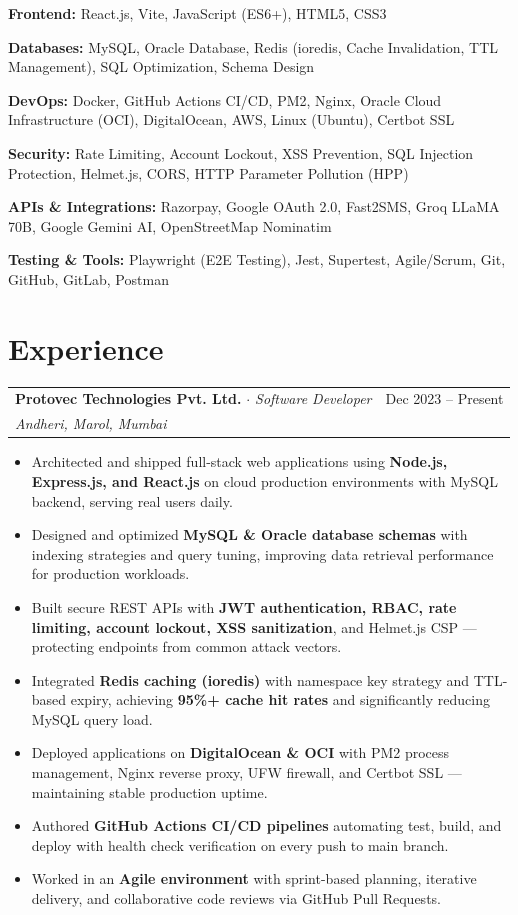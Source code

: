 \documentclass[a4paper,11pt]{article}
\makeatletter
\newcommand{\cvitem}[1]{
  \item\small{\color{darkgray}#1}\vspace{0pt}
}
\newcommand{\jobheading}[4]{
  \vspace{2pt}
  \begin{tabular*}{\textwidth}{l@{\extracolsep{\fill}}r}
    \textbf{\color{darkgray}#1} \small\textit{\color{medgray} $\cdot$ #3} & \small\color{medgray}#2 \\
    \small\color{medgray}\textit{#4} & \\
  \end{tabular*}\vspace{-4pt}
}
\newcommand{\cvlist}{\begin{itemize}[leftmargin=0.20in, rightmargin=0in, topsep=4pt, itemsep=3pt, parsep=0pt]}
\newcommand{\cvlistend}{\end{itemize}\vspace{3pt}}
\makeatother
\begin{document}
\noindent\textbf{\color{primary}Frontend:} React.js, Vite, JavaScript (ES6+), HTML5, CSS3

\noindent\textbf{\color{primary}Databases:} MySQL, Oracle Database, Redis (ioredis, Cache Invalidation, TTL Management), SQL Optimization, Schema Design

\noindent\textbf{\color{primary}DevOps:} Docker, GitHub Actions CI/CD, PM2, Nginx, Oracle Cloud Infrastructure (OCI), DigitalOcean, AWS, Linux (Ubuntu), Certbot SSL

\noindent\textbf{\color{primary}Security:} Rate Limiting, Account Lockout, XSS Prevention, SQL Injection Protection, Helmet.js, CORS, HTTP Parameter Pollution (HPP)

\noindent\textbf{\color{primary}APIs \& Integrations:} Razorpay, Google OAuth 2.0, Fast2SMS, Groq LLaMA 70B, Google Gemini AI, OpenStreetMap Nominatim

\noindent\textbf{\color{primary}Testing \& Tools:} Playwright (E2E Testing), Jest, Supertest, Agile/Scrum, Git, GitHub, GitLab, Postman

\setlength{\parskip}{0pt}
\vspace{-2pt}

\section{Experience}

\vspace{4pt}
\jobheading{Protovec Technologies Pvt. Ltd.}{Dec 2023 -- Present}{Software Developer}{Andheri, Marol, Mumbai}

\cvlist
  \cvitem{Architected and shipped full-stack web applications using \textbf{Node.js, Express.js, and React.js} on cloud production environments with MySQL backend, serving real users daily.}
  \cvitem{Designed and optimized \textbf{MySQL \& Oracle database schemas} with indexing strategies and query tuning, improving data retrieval performance for production workloads.}
  \cvitem{Built secure REST APIs with \textbf{JWT authentication, RBAC, rate limiting, account lockout, XSS sanitization}, and Helmet.js CSP --- protecting endpoints from common attack vectors.}
  \cvitem{Integrated \textbf{Redis caching (ioredis)} with namespace key strategy and TTL-based expiry, achieving \textbf{95\%+ cache hit rates} and significantly reducing MySQL query load.}
  \cvitem{Deployed applications on \textbf{DigitalOcean \& OCI} with PM2 process management, Nginx reverse proxy, UFW firewall, and Certbot SSL --- maintaining stable production uptime.}
  \cvitem{Authored \textbf{GitHub Actions CI/CD pipelines} automating test, build, and deploy with health check verification on every push to main branch.}
  \cvitem{Worked in an \textbf{Agile environment} with sprint-based planning, iterative delivery, and collaborative code reviews via GitHub Pull Requests.}
\cvlistend
\end{document}
